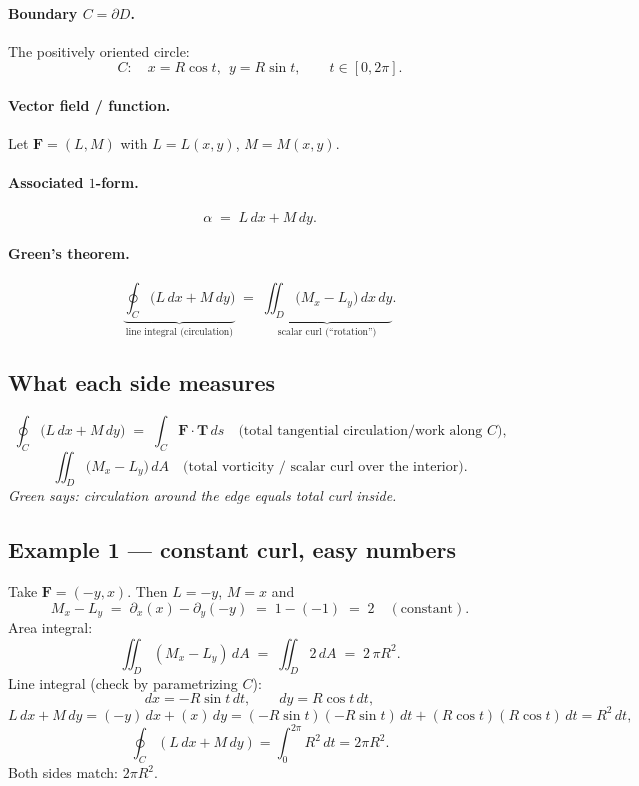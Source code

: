 \documentclass[11pt]{article}
\begin{document}
\paragraph{Boundary $C=\partial D$.}
The positively oriented circle:
\[
C:\quad x=R\cos t,\ \ y=R\sin t,\qquad t\in[0,2\pi].
\]

\paragraph{Vector field / function.}
Let $\mathbf F=(L,M)$ with $L=L(x,y)$, $M=M(x,y)$.

\paragraph{Associated $1$-form.}
\[
\alpha \;=\; L\,dx + M\,dy.
\]

\paragraph{Green’s theorem.}
\[
\underbrace{\oint_{C}\bigl(L\,dx+M\,dy\bigr)}_{\text{line integral (circulation)}}
\;=\;
\underbrace{\iint_{D}\bigl(M_{x}-L_{y}\bigr)\,dx\,dy}_{\text{scalar curl (``rotation'')}}.
\]

\subsection*{What each side measures}
\[
\oint_{C}\bigl(L\,dx+M\,dy\bigr)
\;=\;
\int_{C} \mathbf F\cdot \mathbf T\,ds
\quad\text{(total tangential circulation/work along $C$),}
\]
\[
\iint_{D}\bigl(M_{x}-L_{y}\bigr)\,dA
\quad\text{(total vorticity / scalar curl over the interior).}
\]
\emph{Green says: circulation around the edge equals total curl inside.}

\subsection*{Example 1 — constant curl, easy numbers}
Take $\mathbf F=(-y,x)$. Then $L=-y$, $M=x$ and
\[
M_x - L_y \;=\; \partial_x(x) - \partial_y(-y) \;=\; 1 - (-1) \;=\; 2 \quad(\text{constant}).
\]
Area integral:
\[
\iint_{D} (M_x-L_y)\,dA
\;=\;
\iint_{D} 2\,dA
\;=\; 2\,\pi R^2.
\]
Line integral (check by parametrizing $C$):
\[
dx=-R\sin t\,dt,\qquad dy=R\cos t\,dt,
\]
\[
L\,dx+M\,dy
=
(-y)\,dx + (x)\,dy
=
(-R\sin t)(-R\sin t)\,dt + (R\cos t)(R\cos t)\,dt
=
R^2\,dt,
\]
\[
\oint_{C} (L\,dx+M\,dy)
=
\int_{0}^{2\pi} R^2\,dt
=
2\pi R^2.
\]
Both sides match: $2\pi R^2$.
\end{document}
